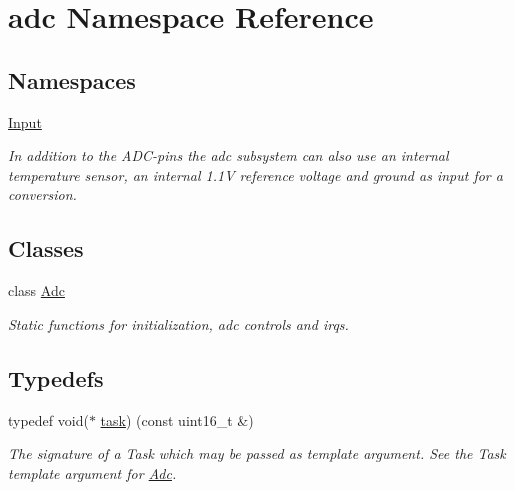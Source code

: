 \hypertarget{namespaceadc}{}\section{adc Namespace Reference}
\label{namespaceadc}
\subsection*{Namespaces}
\begin{DoxyCompactItemize}
\item 
 \hyperlink{namespaceadc_1_1Input}{Input}
\begin{DoxyCompactList}\small\item\em In addition to the A\+D\+C-\/pins the adc subsystem can also use an internal temperature sensor, an internal 1.\+1V reference voltage and ground as input for a conversion. \end{DoxyCompactList}\end{DoxyCompactItemize}
\subsection*{Classes}
\begin{DoxyCompactItemize}
\item 
class \hyperlink{classadc_1_1Adc}{Adc}
\begin{DoxyCompactList}\small\item\em Static functions for initialization, adc controls and irqs. \end{DoxyCompactList}\end{DoxyCompactItemize}
\subsection*{Typedefs}
\begin{DoxyCompactItemize}
\item 
\hypertarget{namespaceadc_a0e6e6773a0ed848acb0887f1ed3c76ae}{}\label{namespaceadc_a0e6e6773a0ed848acb0887f1ed3c76ae} 
typedef void($\ast$ \hyperlink{namespaceadc_a0e6e6773a0ed848acb0887f1ed3c76ae}{task}) (const uint16\+\_\+t \&)
\begin{DoxyCompactList}\small\item\em The signature of a {\ttfamily Task} which may be passed as template argument. See the {\ttfamily Task} template argument for {\ttfamily \hyperlink{classadc_1_1Adc}{Adc}}. \end{DoxyCompactList}\end{DoxyCompactItemize}
